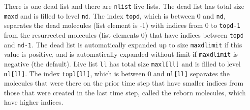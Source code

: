 \documentclass {book}
\begin{document}
There is one dead list and there are \texttt{nlist} live lists. The dead list has total size \texttt{maxd} and is filled to level \texttt{nd}. The index \texttt{topd}, which is between 0 and \texttt{nd}, separates the dead molecules (list element is -1) with indices from 0 to \texttt{topd-1} from the resurrected molecules (list elements 0) that have indices between \texttt{topd} and \texttt{nd-1}. The dead list is automatically expanded up to size \texttt{maxdlimit} if this value is positive, and is automatically expanded without limit if \texttt{maxdlimit} is negative (the default). Live list \texttt{ll} has total size \texttt{maxl[ll]} and is filled to level \texttt{nl[ll]}. The index \texttt{topl[ll]}, which is between 0 and \texttt{nl[ll]} separates the molecules that were there on the prior time step that have smaller indices from those that were created in the last time step, called the reborn molecules, which have higher indices.
\end{document}
